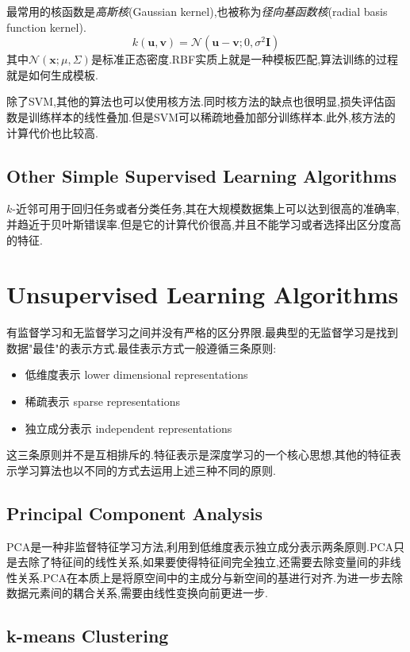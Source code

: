 最常用的核函数是\textit{高斯核}(Gaussian kernel),也被称为\textit{径向基函数核}(radial basis function kernel).
\begin{equation}
k(\bm{u,v})=\mathcal N(\bm{u-v};0,\sigma^2\bm I)
\end{equation}
其中$\mathcal N(\bm x;\mu,\Sigma)$是标准正态密度.RBF实质上就是一种模板匹配,算法训练的过程就是如何生成模板.

除了SVM,其他的算法也可以使用核方法.同时核方法的缺点也很明显,损失评估函数是训练样本的线性叠加.但是SVM可以稀疏地叠加部分训练样本.此外,核方法的计算代价也比较高.

\subsection{Other Simple Supervised Learning Algorithms}

$k$-近邻可用于回归任务或者分类任务,其在大规模数据集上可以达到很高的准确率,并趋近于贝叶斯错误率.但是它的计算代价很高,并且不能学习或者选择出区分度高的特征.

\section{Unsupervised Learning Algorithms}

有监督学习和无监督学习之间并没有严格的区分界限.最典型的无监督学习是找到数据"最佳"的表示方式.最佳表示方式一般遵循三条原则:
\begin{itemize}
\item 低维度表示 lower dimensional representations
\item 稀疏表示 sparse representations
\item 独立成分表示 independent representations
\end{itemize}
这三条原则并不是互相排斥的.特征表示是深度学习的一个核心思想,其他的特征表示学习算法也以不同的方式去运用上述三种不同的原则.

\subsection{Principal Component Analysis}

PCA是一种非监督特征学习方法,利用到低维度表示独立成分表示两条原则.PCA只是去除了特征间的线性关系,如果要使得特征间完全独立,还需要去除变量间的非线性关系.PCA在本质上是将原空间中的主成分与新空间的基进行对齐.为进一步去除数据元素间的耦合关系,需要由线性变换向前更进一步.

\subsection{k-means Clustering}

